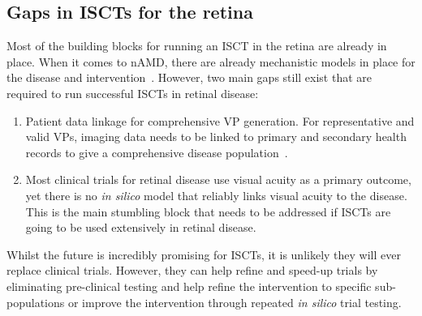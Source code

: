 \documentclass[12pt,a4paper]{journal}
\begin{document}
\subsection*{Gaps in ISCTs for the retina}

Most of the building blocks for running an ISCT in the retina are already in place. When it comes to nAMD, there are already mechanistic models in place for the disease and intervention~\cite{Vega2021, Hoyle2017}. However, two main gaps still exist that are required to run successful ISCTs in retinal disease: 

\begin{enumerate}
\item{Patient data linkage for comprehensive VP generation. For representative and valid VPs, imaging data needs to be linked to primary and secondary health records to give a comprehensive disease population~\cite{ElBouri2021}.}

\item{Most clinical trials for retinal disease use visual acuity as a primary outcome, yet there is no \textit{in silico} model that reliably links visual acuity to the disease. This is the main stumbling block that needs to be addressed if ISCTs are going to be used extensively in retinal disease.}
\end{enumerate}

Whilst the future is incredibly promising for ISCTs, it is unlikely they will ever replace clinical trials. However, they can help refine and speed-up trials by eliminating pre-clinical testing and help refine the intervention to specific sub-populations or improve the intervention through repeated \textit{in silico} trial testing.

 

% 

\end{document}
